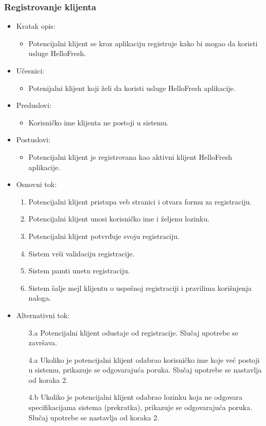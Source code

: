 \subsubsection{Registrovanje klijenta}

\begin{itemize}
    \item Kratak opis:
        \begin{itemize}
            \item Potencijalni klijent se kroz aplikaciju registruje kako bi mogao da koristi usluge HelloFresh.
        \end{itemize}
    \item Učesnici:
        \begin{itemize}
            \item Potenijalni klijent koji želi da koristi usluge HelloFresh aplikacije.
        \end{itemize}
    \item Preduslovi:
        \begin{itemize}
            \item Korisničko ime klijenta ne postoji u sistemu.
        \end{itemize}
    \item Postuslovi:
        \begin{itemize}
            \item Potencijalni klijent je registrovana kao aktivni klijent HelloFresh aplikacije.
        \end{itemize}
    \item Osnovni tok:
        \begin{enumerate}
            \item Potencijalni klijent pristupa veb stranici i otvara formu za registraciju.
            \item Potencijalni klijent unosi korisničko ime i željenu lozinku.
            \item Potencijalni klijent potvrđuje svoju registraciju.
            \item Sistem vrši validaciju registracije.
            \item Sistem pamti unetu registraciju.
            \item Sistem šalje mejl klijentu o uspešnoj registraciji i pravilima korišnjenja naloga.
        \end{enumerate}
    \item Alternativni tok:
        \begin{itemize}
            \item[3.a] Potencijalni klijent odustaje od registracije. Slučaj upotrebe se završava.
            \item[4.a] Ukoliko je potencijalni klijent odabrao korisničko ime koje već postoji u sistemu, prikazuje se odgovarajuća poruka. Slučaj upotrebe se nastavlja od koraka 2.
            \item[4.b] Ukoliko je potencijalni klijent odabrao lozinku koja ne odgovara specifikacijama sistema (prekratka), prikazuje se odgovarajuća poruka. Slučaj upotrebe se nastavlja od koraka 2.
        \end{itemize}
\end{itemize}

